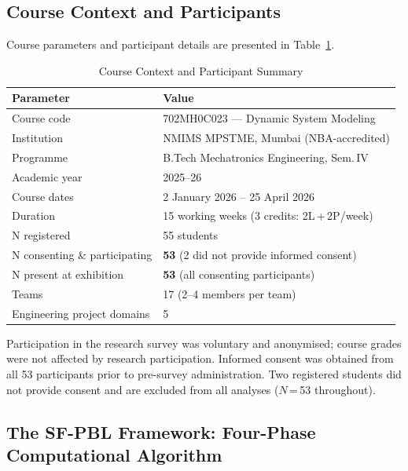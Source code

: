 \documentclass[12pt, a4paper]{article}
\begin{document}
\subsection{Course Context and Participants}

Course parameters and participant details are presented in
Table~\ref{tab:context}.

\begin{table}[ht]
\centering
\caption{Course Context and Participant Summary}
\label{tab:context}
\begin{tabular}{ll}
\toprule
\textbf{Parameter} & \textbf{Value} \\
\midrule
Course code                    & 702MH0C023 --- Dynamic System Modeling \\
Institution                    & NMIMS MPSTME, Mumbai (NBA-accredited) \\
Programme                      & B.Tech Mechatronics Engineering, Sem.\,IV \\
Academic year                  & 2025--26 \\
Course dates                   & 2 January 2026 -- 25 April 2026 \\
Duration                       & 15 working weeks (3 credits: 2L\,+\,2P/week) \\
N registered                   & 55 students \\
N consenting \& participating  & \textbf{53} (2 did not provide informed consent) \\
N present at exhibition        & \textbf{53} (all consenting participants) \\
Teams                          & 17 (2--4 members per team) \\
Engineering project domains    & 5 \\
\bottomrule
\end{tabular}
\end{table}

Participation in the research survey was voluntary and anonymised;
course grades were not affected by research participation. Informed
consent was obtained from all 53 participants prior to pre-survey
administration. Two registered students did not provide consent
and are excluded from all analyses ($N$\,=\,53 throughout).

\subsection{The SF-PBL Framework: Four-Phase Computational Algorithm}
\end{document}
